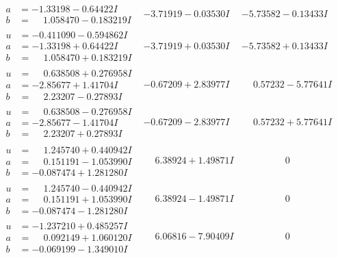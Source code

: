 \documentclass[1p]{elsarticle_modified}
\theoremstyle{definition}
\begin{document}
$$\begin{array}{c|c|c}
\begin{aligned}
a &= -1.33198 - 0.64422 I \\
b &= \phantom{-}1.058470 - 0.183219 I\end{aligned}
 & -3.71919 - 0.03530 I & -5.73582 - 0.13433 I \\ \hline\begin{aligned}
u &= -0.411090 - 0.594862 I \\
a &= -1.33198 + 0.64422 I \\
b &= \phantom{-}1.058470 + 0.183219 I\end{aligned}
 & -3.71919 + 0.03530 I & -5.73582 + 0.13433 I \\ \hline\begin{aligned}
u &= \phantom{-}0.638508 + 0.276958 I \\
a &= -2.85677 + 1.41704 I \\
b &= \phantom{-}2.23207 - 0.27893 I\end{aligned}
 & -0.67209 + 2.83977 I & \phantom{-}0.57232 - 5.77641 I \\ \hline\begin{aligned}
u &= \phantom{-}0.638508 - 0.276958 I \\
a &= -2.85677 - 1.41704 I \\
b &= \phantom{-}2.23207 + 0.27893 I\end{aligned}
 & -0.67209 - 2.83977 I & \phantom{-}0.57232 + 5.77641 I \\ \hline\begin{aligned}
u &= \phantom{-}1.245740 + 0.440942 I \\
a &= \phantom{-}0.151191 - 1.053990 I \\
b &= -0.087474 + 1.281280 I\end{aligned}
 & \phantom{-}6.38924 + 1.49871 I & \phantom{-0.000000 } 0 \\ \hline\begin{aligned}
u &= \phantom{-}1.245740 - 0.440942 I \\
a &= \phantom{-}0.151191 + 1.053990 I \\
b &= -0.087474 - 1.281280 I\end{aligned}
 & \phantom{-}6.38924 - 1.49871 I & \phantom{-0.000000 } 0 \\ \hline\begin{aligned}
u &= -1.237210 + 0.485257 I \\
a &= \phantom{-}0.092149 + 1.060120 I \\
b &= -0.069199 - 1.349010 I\end{aligned}
 & \phantom{-}6.06816 - 7.90409 I & \phantom{-0.000000 } 0\\

\end{array}$$
\end{document}
